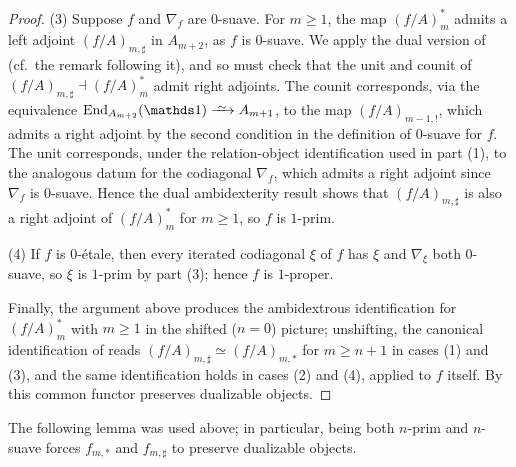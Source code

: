 \documentclass[11pt]{book}
\begin{document}
\begin{proof}
		(3) Suppose $f$ and $\nabla_f$ are $0$-suave. For $m \geq 1$, the map $(f/A)^*_m$ admits a left adjoint $(f/A)_{m,\sharp}$ in $A_{m+2}$, as $f$ is $0$-suave. We apply the dual version of  (cf.\ the remark following it), and so must check that the unit and counit of $(f/A)_{m,\sharp} \dashv (f/A)^*_m$ admit right adjoints. The counit corresponds, via the equivalence $\End_{A_{m+2}}(\unit) \iso A_{m+1}$, to the map $(f/A)_{m-1,!}$, which admits a right adjoint by the second condition in the definition of $0$-suave for $f$. The unit corresponds, under the relation-object identification used in part (1), to the analogous datum for the codiagonal $\nabla_f$, which admits a right adjoint since $\nabla_f$ is $0$-suave. Hence the dual ambidexterity result shows that $(f/A)_{m,\sharp}$ is also a right adjoint of $(f/A)^*_m$ for $m \geq 1$, so $f$ is $1$-prim.

		(4) If $f$ is $0$-\'etale, then every iterated codiagonal $\xi$ of $f$ has $\xi$ and $\nabla_{\xi}$ both $0$-suave, so $\xi$ is $1$-prim by part (3); hence $f$ is $1$-proper.

		Finally, the argument above produces the ambidextrous identification for $(f/A)^*_m$ with $m \geq 1$ in the shifted ($n = 0$) picture; unshifting, the canonical identification of  reads $(f/A)_{m,\sharp} \simeq (f/A)_{m,*}$ for $m \geq n+1$ in cases (1) and (3), and the same identification holds in cases (2) and (4), applied to $f$ itself. By  this common functor preserves dualizable objects.
	\end{proof}

	The following lemma was used above; in particular, being both $n$-prim and $n$-suave forces $f_{m,*}$ and $f_{m,\sharp}$ to preserve dualizable objects.
\end{document}
